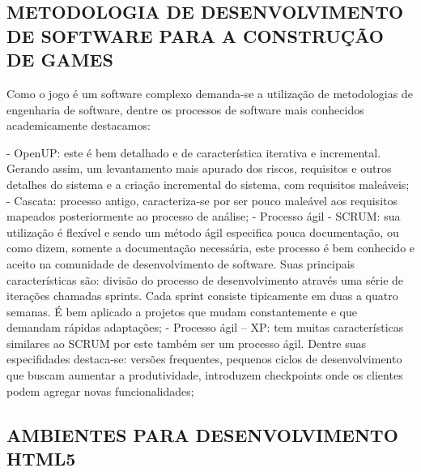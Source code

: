 \documentclass[11pt,a4paper]{article}
\begin{document}
\subsection{ METODOLOGIA DE DESENVOLVIMENTO DE SOFTWARE PARA A CONSTRUÇÃO DE GAMES}

Como o jogo é um software complexo demanda-se a utilização de metodologias de engenharia de software, dentre os processos de software mais conhecidos academicamente destacamos:

- OpenUP: este é bem detalhado e de característica iterativa e incremental. Gerando assim, um levantamento mais apurado dos riscos, requisitos e outros detalhes do sistema e a criação incremental do sistema, com requisitos maleáveis;
- Cascata: processo antigo, caracteriza-se por ser pouco maleável aos requisitos mapeados posteriormente ao processo de análise;
- Processo ágil - SCRUM: sua utilização é flexível e sendo um método ágil especifica pouca documentação, ou como dizem, somente a documentação necessária, este processo é bem conhecido e aceito na comunidade de desenvolvimento de software. Suas principais características são: divisão do processo de desenvolvimento através uma série de iterações chamadas sprints. Cada sprint consiste tipicamente em duas a quatro semanas. É bem aplicado a projetos que mudam constantemente e que demandam rápidas adaptações;
- Processo ágil – XP: tem muitas características similares ao SCRUM por este também ser um processo ágil. Dentre suas especifidades destaca-se: versões frequentes, pequenos ciclos de desenvolvimento que buscam aumentar a produtividade, introduzem checkpoints onde os clientes podem agregar novas funcionalidades;

\subsection{ AMBIENTES PARA DESENVOLVIMENTO HTML5}
\end{document}
